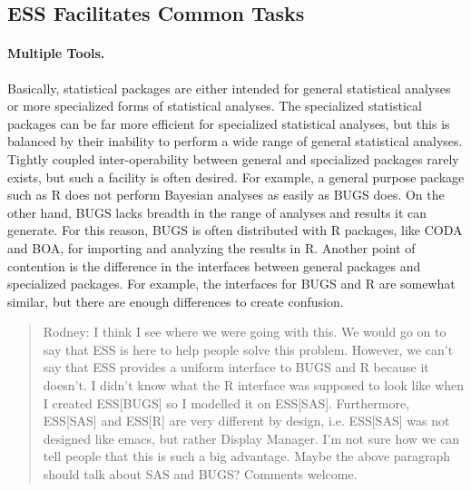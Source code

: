 \documentclass{article}
\begin{document}
\subsection{ESS Facilitates Common Tasks}
\label{sec:ess-facil-comm}

\paragraph{Multiple Tools.}
\label{sec:multiple-tools}

Basically, statistical packages are either intended for general
statistical analyses or more specialized forms of statistical analyses.
The specialized statistical packages can be far more efficient for
specialized statistical analyses, but this is balanced by their inability
to perform a wide range of general statistical analyses.  Tightly coupled
inter-operability between general and specialized packages rarely exists,
but such a facility is often desired.  For example, a general purpose
package such as R does not perform Bayesian analyses as easily as BUGS does.
On the other hand, BUGS lacks breadth in the range of analyses and results
it can generate.  For this reason, BUGS is often distributed with R packages,
like CODA and BOA, for importing and analyzing the results in R.  Another
point of contention is the difference in the interfaces between general
packages and specialized packages.  For example, the interfaces for BUGS
and R are somewhat similar, but there are enough differences to create confusion.

\begin{quote}
 Rodney:  I think I see where we were going with this.  We would go on to
say that ESS is here to help people solve this problem.  However,
we can't say that ESS provides a uniform interface to BUGS and R because
it doesn't.  I didn't know what the R interface was supposed to look like
when I created ESS[BUGS] so I modelled it on ESS[SAS].  Furthermore,
ESS[SAS] and ESS[R] are very different by design, i.e. ESS[SAS] was not
designed like emacs, but rather Display Manager.  I'm not sure how we can tell
people that this is such a big advantage.  Maybe the above paragraph
should talk about SAS and BUGS?  Comments welcome.
\end{quote}
\end{document}
